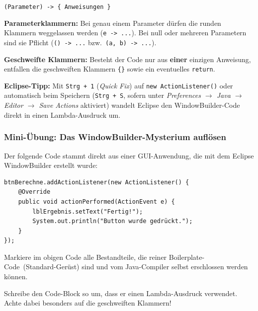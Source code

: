 \begin{tcolorbox}[colback=blue!5,colframe=lightblue,boxrule=0.8pt,arc=3pt,title={\textbf{Info: Syntax-Regeln für Lambda-Ausdrücke}}]
\small
\begin{center}
\lstinline|(Parameter) -> { Anweisungen }|
\end{center}
\begin{compactenum}[1.]
  \item \textbf{Parameterklammern:} Bei genau einem Parameter dürfen die
  runden Klammern weggelassen werden (\lstinline|e -> ...|). Bei null oder
  mehreren Parametern sind sie Pflicht (\lstinline|() -> ...| bzw.\
  \lstinline|(a, b) -> ...|).
  \item \textbf{Geschweifte Klammern:} Besteht der Code nur aus \textbf{einer}
  einzigen Anweisung, entfallen die geschweiften Klammern \texttt{\{\}} sowie
  ein eventuelles \lstinline|return|.
\end{compactenum}
\medskip
\noindent \textbf{Eclipse-Tipp:} Mit \texttt{Strg + 1} (\emph{Quick Fix}) auf
\lstinline|new ActionListener()| oder automatisch beim Speichern (\texttt{Strg + S},
sofern unter \emph{Preferences $\rightarrow$ Java $\rightarrow$ Editor $\rightarrow$ Save Actions}
aktiviert) wandelt Eclipse den WindowBuilder-Code direkt in einen
Lambda-Ausdruck um.
\end{tcolorbox}

\subsubsection*{Mini-Übung: Das WindowBuilder-Mysterium auflösen}
Der folgende Code stammt direkt aus einer GUI-Anwendung, die mit dem Eclipse
WindowBuilder erstellt wurde:

\begin{lstlisting}
btnBerechne.addActionListener(new ActionListener() {
    @Override
    public void actionPerformed(ActionEvent e) {
        lblErgebnis.setText("Fertig!");
        System.out.println("Button wurde gedrückt.");
    }
});
\end{lstlisting}

\begin{compactenum}[a)]
\item Markiere im obigen Code alle Bestandteile, die reiner
\glqq Boilerplate-Code\grqq\ (Standard-Gerüst) sind und vom Java-Compiler
selbst erschlossen werden können.
\item Schreibe den Code-Block so um, dass er einen Lambda-Ausdruck verwendet.
Achte dabei besonders auf die geschweiften Klammern!
\end{compactenum}





